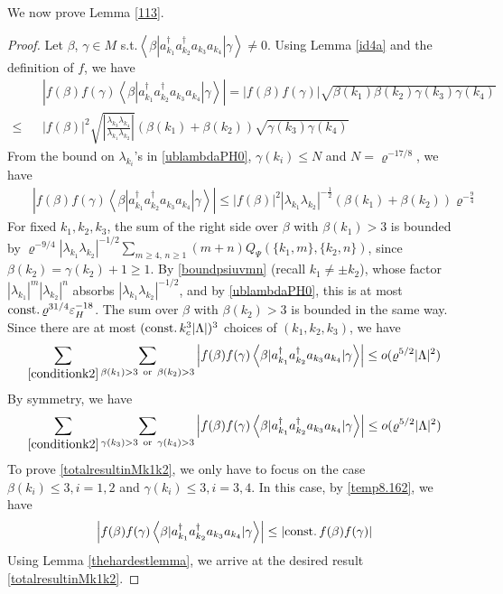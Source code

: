 \documentclass[11pt]{article}
\numberwithin{equation}{section}
\newcommand{\beq}{\begin{equation}}
\newcommand{\eeq}{\end{equation}}
\newcommand{\beqa}{\begin{eqnarray}}
\newcommand{\eeqa}{\end{eqnarray}}
\newcommand\eps{\varepsilon}
\newcommand\rmor{ \,\,\,{\rm or}\,\,\, }
\newcommand\const{{\rm const.\, }}
\newcommand\be{\beta}
\renewcommand\rho\varrho
\theoremstyle{definition}
\begin{document}
We now prove Lemma \ref{113}. 
\begin{proof} Let $\be$, $\gamma\in M$ s.t.$\left\langle\be| a^\dagger_{k_1}a^\dagger_{k_2}a_{k_3}a_{k_4}|\gamma\right\rangle\neq 0$. Using Lemma \ref{id4a} and the definition of $f$, we have 
\beqa\nonumber
&&\left|f(\be)f(\gamma)\left\langle\be|  a^\dagger_{k_1}a^\dagger_{k_2}a_{k_3}a_{k_4}|\gamma\right\rangle\right|=\left|f(\be)f(\gamma)\right|\sqrt{\be(k_1)\be(k_2)\gamma(k_3)\gamma(k_4)}\\\label{temp8.162}
\leq &&|f(\be)|^2\sqrt{\left|\frac{\lambda_{k_3}\lambda_{k_4}}{\lambda_{k_1}\lambda_{k_2}}\right|}(\be(k_1)+\be(k_2))\sqrt{\gamma(k_3)\gamma(k_4)}
\eeqa
{F}rom  the bound on  $\lambda_{k_i}$'s in \eqref{ublambdaPH0}, $\gamma(k_i)\leq N$ and  $N=\rho^{-17/8}$, we have
\beqa\nonumber
&&\left|f(\be)f(\gamma)\left\langle\be|  a^\dagger_{k_1}a^\dagger_{k_2}a_{k_3}a_{k_4}|\gamma\right\rangle\right|\leq |f(\be)|^2\left|\lambda_{k_1}\lambda_{k_2}\right|^{-\frac{1}{2}}(\be(k_1)+\be(k_2))\rho^{-\frac{9}{4}}
\eeqa
For fixed $k_1,k_2,k_3$, the sum of the right side over $\be$ with $\be(k_1)>3$ is bounded by $\rho^{-9/4}|\lambda_{k_1}\lambda_{k_2}|^{-1/2}\sum_{m\geq 4,\,n\geq 1}(m+n)Q_\Psi(\{k_1,m\},\{k_2,n\})$, since $\be(k_2)=\gamma(k_2)+1\geq 1$. By \eqref{boundpsiuvmn} (recall $k_1\neq\pm k_2$), whose factor $|\lambda_{k_1}|^m|\lambda_{k_2}|^n$ absorbs $|\lambda_{k_1}\lambda_{k_2}|^{-1/2}$, and by \eqref{ublambdaPH0}, this is at most $\const\rho^{31/4}\eps_H^{-18}$. The sum over $\be$ with $\be(k_2)>3$ is bounded in the same way. Since there are at most $(\const k_c^3|\Lambda|)^3$ choices of $(k_1,k_2,k_3)$, we have 
\beq
\sum_{\eqref{conditionk2}}\sum_{\be(k_1)>3 \rmor \be(k_2)>3}\left|f(\be)f(\gamma)\left\langle\be| a^\dagger_{k_1}a^\dagger_{k_2}a_{k_3}a_{k_4}|\gamma\right\rangle\right|\leq o(\rho^{5/2}|\Lambda|^2)
\eeq
By symmetry, we have
\beq
\sum_{\eqref{conditionk2}}\sum_{\gamma(k_3)>3 \rmor \gamma(k_4)>3}\left|f(\be)f(\gamma)\left\langle\be| a^\dagger_{k_1}a^\dagger_{k_2}a_{k_3}a_{k_4}|\gamma\right\rangle\right|\leq o(\rho^{5/2}|\Lambda|^2)
\eeq
To prove \eqref{totalresultinMk1k2}, we only have  to focus on the case  $\be(k_{i})\leq 3, i=1, 2$ and $\gamma(k_{i})\leq 3, i=3, 4$. In this case, by \eqref{temp8.162},  we have
\beq\left|f(\be)f(\gamma)\left\langle\be|  a^\dagger_{k_1}a^\dagger_{k_2}a_{k_3}a_{k_4}|\gamma\right\rangle\right|\leq \left|\const f(\be)f(\gamma)\right|
\eeq
Using Lemma \ref{thehardestlemma}, we arrive at the desired result \eqref{totalresultinMk1k2}.
\end{proof}
\end{document}
